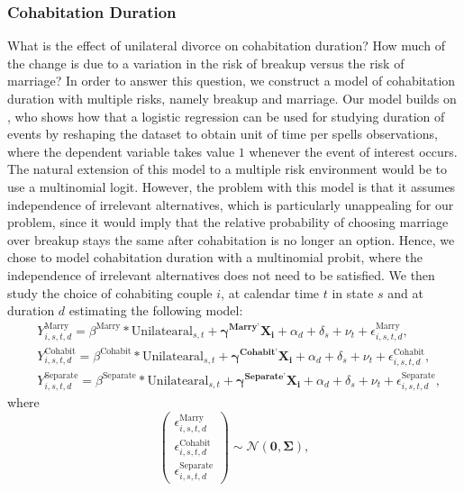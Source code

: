 \documentclass[12pt]{article}
\newcommand{\myvec}[1]{\ensuremath{\begin{pmatrix}#1\end{pmatrix}}}
\numberwithin{table}{section}
\begin{document}
\subsubsection*{Cohabitation Duration}
What is the effect of unilateral divorce on cohabitation duration? How much of the change is due to a variation in the risk of breakup versus the risk of marriage? In order to answer this question, we construct a model of cohabitation duration with multiple risks, namely breakup and marriage. Our model builds on \cite{jenkins1995}, who shows how that a logistic regression can be used for studying duration of events by reshaping the dataset to obtain unit of time per spells observations, where the dependent variable takes value $1$ whenever the event of interest occurs. The natural extension of this model to a multiple risk environment would be to use a multinomial logit. However, the problem with this model is that it assumes independence of irrelevant alternatives, which is particularly unappealing for our problem, since it would imply that the relative probability of choosing marriage over breakup stays the same after cohabitation is no longer an option. Hence, we chose to model cohabitation duration with a multinomial probit, where the independence of irrelevant alternatives does not need to be satisfied. We then study the choice of cohabiting couple $i$, at calendar time $t$ in state $s$ and at duration $d$ estimating the following model: 
\begin{equation}\label{eq:probit_1}
\begin{split}
&Y_{i,s,t,d}^\text{Marry}=\beta^\text{Marry}*\text{Unilatearal}_{s,t}+\mathbf{\gamma^{\text{Marry'}}}\mathbf{X_i}+\alpha_d+\delta_s+\nu_t+\epsilon^{\text{Marry}}_{i,s,t,d},\\&
Y_{i,s,t,d}^\text{Cohabit}=\beta^\text{Cohabit}*\text{Unilatearal}_{s,t}+\mathbf{\gamma^{\text{Cohabit'}}}\mathbf{X_i}+\alpha_d+\delta_s+\nu_t+\epsilon^{\text{Cohabit}}_{i,s,t,d},\\&
Y_{i,s,t,d}^\text{Separate}=\beta^\text{Separate}*\text{Unilatearal}_{s,t}+\mathbf{\gamma^{\text{Separate'}}}\mathbf{X_i}+\alpha_d+\delta_s+\nu_t+\epsilon^{\text{Separate}}_{i,s,t,d},
\end{split}
\end{equation}
where
\begin{equation}\label{eq:probit_error}
\myvec{\epsilon_{i,s,t,d}^{\text{Marry}}\\\epsilon_{i,s,t,d}^{\text{Cohabit}}\\\epsilon_{i,s,t,d}^{\text{Separate}}}\sim\mathcal{N}(\mathbf{0},\mathbf{\Sigma}),
\end{equation}
\end{document}
